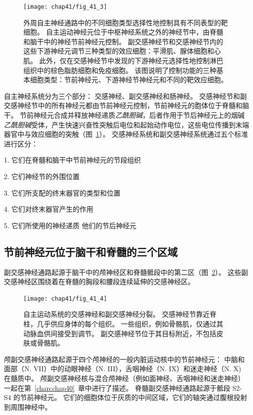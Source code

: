 \begin{figure}[htbp]
	\centering
	\texttt{[image: chap41/fig\_41\_3]}
	\caption{外周自主神经通路中的不同细胞类型选择性地控制具有不同表型的靶细胞。
		自主运动神经元位于中枢神经系统之外的神经节中，由脊髓和脑干中的神经节前神经元控制。
		副交感神经节和交感神经节内的这些下游神经元调节三种类型的效应细胞：平滑肌、腺体细胞和心肌。
		此外，仅在交感神经节中发现的下游神经元选择性地控制淋巴组织中的棕色脂肪细胞和免疫细胞。
		该图说明了控制功能的三种基本细胞类型：节前神经元、下游神经节神经元和不同的靶效应细胞。}
	\label{fig:41_3}
\end{figure}


自主神经系统分为三个部分：
交感神经、副交感神经和肠神经。
交感神经节和副交感神经节中的所有神经元都由节前神经元控制，节前神经元的胞体位于脊髓和脑干。
节前神经元合成并释放神经递质\textit{乙酰胆碱}，后者作用于节后神经元上的烟碱\textit{乙酰胆碱}受体，产生快速兴奋性突触后电位和起始动作电位，这些电位传播到末端器官中与效应细胞的突触（图~\ref{fig:41_3}）。 
交感神经系统和副交感神经系统通过五个标准进行区分：

1. 它们在脊髓和脑干中节前神经元的节段组织 

2. 它们神经节的外围位置 

3. 它们所支配的终末器官的类型和位置 

4. 它们对终末器官产生的作用 

5. 它们所使用的神经递质 他们的节后神经元



\subsection{节前神经元位于脑干和脊髓的三个区域}

副交感神经通路起源于脑干中的颅神经区和脊髓骶段中的第二区（图~\ref{fig:41_4}）。
这些副交感神经区围绕着在脊髓的胸段和腰段连续延伸的交感神经区。


\begin{figure}[htbp]
	\centering
	\texttt{[image: chap41/fig\_41\_4]}
	\caption{自主运动系统的交感神经和副交感神经分裂。
		交感神经节靠近脊柱，几乎供应身体的每个组织。
		一些组织，例如骨骼肌，仅通过其动脉血供间接受到调节。
		副交感神经节位于其目标附近，不包括皮肤或骨骼肌。}
	\label{fig:41_4}
\end{figure}


颅副交感神经通路起源于四个颅神经的一般内脏运动核中的节前神经元：
中脑和面部（N. VII）中的动眼神经（N. III），舌咽神经（N. IX）和迷走神经（N. X) 在髓质中。 颅副交感神经核与混合颅神经（例如面神经、舌咽神经和迷走神经）一起在第~\ref{chap:chap40}~章中进行了描述。
脊髓副交感神经通路起源于骶段 S2-S4 的节前神经元。
它们的细胞体位于灰质的中间区域，它们的轴突通过腹根投射到周围神经中。


